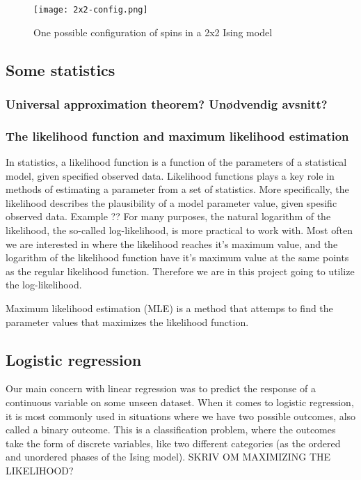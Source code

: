 \documentclass[a4paper,12pt]{article}
\begin{document}
\begin{figure}[h!]
  \centering
  \caption{One possible configuration of spins in a 2x2 Ising model}
  \texttt{[image: 2x2-config.png]}
\end{figure}

\subsection{Some statistics}

\subsubsection{Universal approximation theorem? Unødvendig avsnitt?}

\subsubsection{The likelihood function and maximum likelihood estimation}
In statistics, a likelihood function is a function of the parameters of a statistical model, given specified observed data. Likelihood functions plays a key role in methods of estimating a parameter from a set of statistics. More specifically, the likelihood describes the plausibility of a model parameter value, given spesific observed data. Example ??\newline
For many purposes, the natural logarithm of the likelihood, the so-called log-likelihood, is more practical to work with. Most often we are interested in where the likelihood reaches it's maximum value, and the logarithm of the likelihood function have it's maximum value at the same points as the regular likelihood function. Therefore we are in this project going to utilize the log-likelihood.\newline

Maximum likelihood estimation (MLE) is a method that attemps to find the parameter values that maximizes the likelihood function.



\subsection{Logistic regression}
Our main concern with linear regression was to predict the response of a continuous variable on some unseen dataset. When it comes to logistic regression, it is most commonly used in situations where we have two possible outcomes, also called a binary outcome. This is a classification problem, where the outcomes take the form of discrete variables, like two different categories (as the ordered and unordered phases of the Ising model).\newline
SKRIV OM MAXIMIZING THE LIKELIHOOD?
\end{document}

